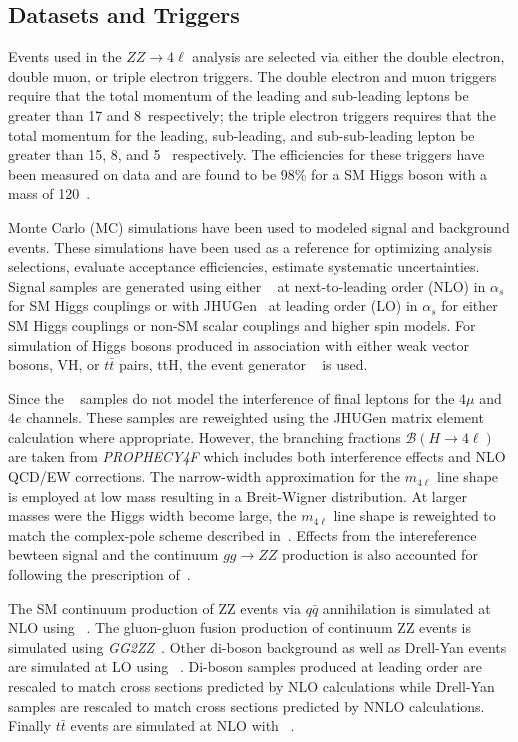 \subsection{Datasets and Triggers}
\label{sec:HZZ4ldatasets}

Events used in the $ZZ\to 4\ell$ analysis are selected via either the
double electron, double muon, or triple electron triggers.  The
double electron and muon triggers require that the total momentum
of the leading and sub-leading leptons be greater than 17 and 
8~\GeV respectively; the triple electron triggers requires that
the total momentum for the leading, sub-leading, and 
sub-sub-leading lepton be greater than 15, 8, and 5~\GeV 
respectively.  The efficiencies for these triggers have been 
measured on data and are found to be 98\% for a SM Higgs boson 
with a mass of 120~\GeV.  

Monte Carlo (MC) simulations have been used to modeled signal 
and background events.  These simulations have been used as a
reference for optimizing analysis selections, evaluate acceptance
efficiencies, estimate systematic uncertainties.  Signal samples
are generated using either \POWHEG~\cite{???} at next-to-leading 
order (NLO) in $\alpha_s$ for SM Higgs couplings or with 
JHUGen~\cite{???} at leading order (LO) in $\alpha_s$ for either
SM Higgs couplings or non-SM scalar couplings and higher spin
models.  For simulation of Higgs bosons produced in association
with either weak vector bosons, VH, or $t\bar{t}$ pairs, ttH, 
the event generator \PYTHIA~\cite{???} is used.  

Since the \POWHEG~ samples do not model the interference
of final leptons for the $4\mu$ and $4e$ channels.  These samples
are reweighted using the JHUGen matrix element calculation where
appropriate.  However, the branching fractions 
$\mathscr{B}(H\to 4\ell)$ are taken from {\it PROPHECY4F} which 
includes both interference effects and NLO QCD/EW corrections. 
The narrow-width approximation for the $m_{4\ell}$
line shape is employed at low mass resulting in a Breit-Wigner
distribution.  At larger masses were the Higgs width become large,
the $m_{4\ell}$ line shape is reweighted to match the complex-pole
scheme described in~\cite{???}.  Effects from the intereference
bewteen signal and the continuum $gg\to ZZ$ production is also 
accounted for following the prescription of~\cite{???}.

The SM continuum production of ZZ events via $q\bar{q}$
annihilation is simulated at NLO using \POWHEG~.  The gluon-gluon
fusion production of continuum ZZ events is simulated using
{\it GG2ZZ}~\cite{???}. Other di-boson background as well 
as Drell-Yan events  are simulated at LO using \MADGRAPH~.  
Di-boson samples produced at leading order are rescaled to match
cross sections predicted by NLO calculations while Drell-Yan 
samples are rescaled to match cross sections predicted by NNLO
calculations.  Finally $t\bar{t}$ events are simulated at NLO
with \POWHEG~.

